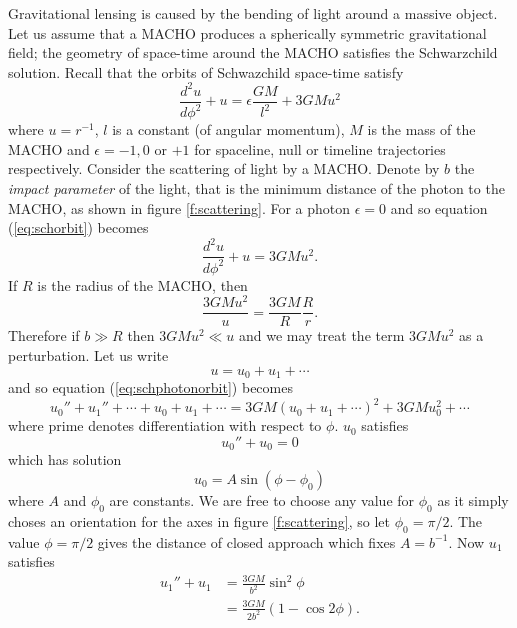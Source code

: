 Gravitational lensing is caused by the bending of light around a massive
object. Let us assume that a MACHO produces a spherically symmetric
gravitational field; the geometry of space-time around the MACHO satisfies the
Schwarzchild solution. Recall that the orbits of Schwazchild space-time
satisfy
\begin{equation}
\frac{d^2 u}{d\phi^2} + u = \epsilon \frac{GM}{l^2} + 3GMu^2
\label{eq:schorbit}
\end{equation}
where $u = r^{-1}$, $l$ is a constant (of angular momentum), $M$ is the mass
of the MACHO and $\epsilon = -1,0$ or $+1$ for spaceline, null or timeline
trajectories respectively. Consider the scattering of light by a MACHO. Denote
by $b$ the \emph{impact parameter} of the light, that is the minimum distance
of the photon to the MACHO, as shown in figure \ref{f:scattering}. For a
photon $\epsilon = 0$ and so equation (\ref{eq:schorbit}) becomes
\begin{equation}
\frac{d^2 u}{d\phi^2} + u =  3GMu^2.
\label{eq:schphotonorbit}
\end{equation}
If $R$ is the radius of the MACHO, then
\begin{equation}
\frac{3GMu^2}{u} = \frac{3GM}{R} \frac{R}{r}.
\end{equation}
Therefore if $b \gg R$ then $3GMu^2 \ll u$ and we may treat the term
$3GMu^2$ as a perturbation. Let us write
\begin{equation}
u = u_0 + u_1 + \cdots
\end{equation}
and so equation (\ref{eq:schphotonorbit}) becomes
\begin{equation}
u_0'' + u_1'' + \cdots + u_0 + u_1 + \cdots = 3GM\left(u_0 + u_1 +
\cdots\right)^2 + 3GMu_0^2 + \cdots
\end{equation}
where prime denotes differentiation with respect to $\phi$. $u_0$ satisfies
\begin{equation}
u_0'' + u_0 = 0
\end{equation}
which has solution
\begin{equation}
u_0 = A \sin \left(\phi - \phi_0\right)
\end{equation}
where $A$ and $\phi_0$ are constants. We are free to choose any value for
$\phi_0$ as it simply choses an orientation for the axes in figure
\ref{f:scattering}, so let $\phi_0 = \pi /2$. The value $\phi = \pi / 2$
gives the distance of closed approach which fixes $A = b^{-1}$. Now $u_1$
satisfies
\begin{equation}
\begin{split}
u_1'' + u_1 &= \frac{3GM}{b^2} \sin^2 \phi \\
&= \frac{3GM}{2b^2}\left(1 - \cos 2\phi\right).
\label{eq:u1eq}
\end{split}
\end{equation}
